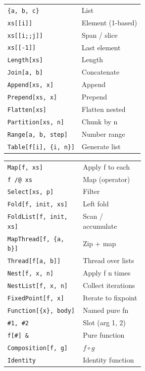\documentclass[10pt]{extarticle}
\begin{document}
\begin{multicols}{2}
\begin{tabularx}{\linewidth}{@{}l@{\enspace}Y@{}}
\texttt{\{a, b, c\}}               & List \\
\texttt{xs[[i]]}                    & Element (1-based) \\
\texttt{xs[[i;;j]]}                & Span / slice \\
\texttt{xs[[-1]]}                   & Last element \\
\texttt{Length[xs]}                 & Length \\
\texttt{Join[a, b]}                & Concatenate \\
\texttt{Append[xs, x]}             & Append \\
\texttt{Prepend[xs, x]}            & Prepend \\
\texttt{Flatten[xs]}               & Flatten nested \\
\texttt{Partition[xs, n]}          & Chunk by n \\
\texttt{Range[a, b, step]}         & Number range \\
\texttt{Table[f[i], \{i, n\}]}    & Generate list \\
\end{tabularx}

\begin{tabularx}{\linewidth}{@{}>{\raggedright\arraybackslash}p{0.55\linewidth}@{\enspace}Y@{}}
\texttt{Map[f, xs]}                 & Apply f to each \\
\texttt{f /@ xs}                    & Map (operator) \\
\texttt{Select[xs, p]}             & Filter \\
\texttt{Fold[f, init, xs]}         & Left fold \\
\texttt{FoldList[f, init, xs]}     & Scan / accumulate \\
\texttt{MapThread[f, \{a, b\}]}   & Zip + map \\
\texttt{Thread[f[a, b]]}           & Thread over lists \\
\texttt{Nest[f, x, n]}             & Apply f n times \\
\texttt{NestList[f, x, n]}         & Collect iterations \\
\texttt{FixedPoint[f, x]}          & Iterate to fixpoint \\
\texttt{Function[\{x\}, body]}     & Named pure fn \\
\texttt{\#1, \#2}                   & Slot (arg 1, 2) \\
\texttt{f[\#] \&}                   & Pure function \\
\texttt{Composition[f, g]}         & $f \circ g$ \\
\texttt{Identity}                   & Identity function \\
\end{tabularx}


\end{multicols}
\end{document}
